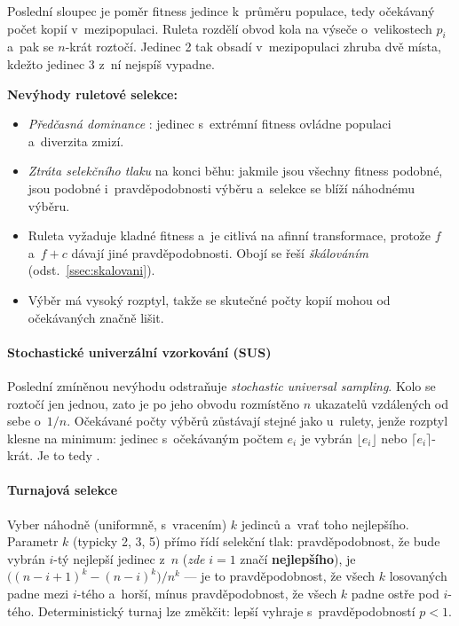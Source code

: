 \documentclass[11pt,a4paper]{article}
\theoremstyle{definition}
\begin{document}
Poslední sloupec je poměr fitness jedince k~průměru populace, tedy očekávaný počet kopií
v~mezipopulaci. Ruleta rozdělí obvod kola na výseče o~velikostech $p_i$ a~pak se $n$-krát
roztočí. Jedinec 2 tak obsadí v~mezipopulaci zhruba dvě místa, kdežto jedinec 3 z~ní nejspíš
vypadne.

\textbf{Nevýhody ruletové selekce:}
\begin{itemize}
\item \emph{Předčasná dominance} : jedinec s~extrémní fitness
  ovládne populaci a~diverzita zmizí.
\item \emph{Ztráta selekčního tlaku} na konci běhu: jakmile jsou všechny fitness
  podobné, jsou podobné i~pravděpodobnosti výběru a~selekce se blíží náhodnému výběru.
\item Ruleta vyžaduje kladné fitness a~je citlivá na afinní transformace, protože
  $f$ a~$f + c$ dávají jiné pravděpodobnosti. Obojí se řeší \emph{škálováním}
  (odst.~\ref{ssec:skalovani}).
\item Výběr má vysoký rozptyl, takže se skutečné počty kopií mohou od očekávaných
  značně lišit.
\end{itemize}

\paragraph{Stochastické univerzální vzorkování (SUS)}

Poslední zmíněnou nevýhodu odstraňuje \emph{stochastic universal sampling}. Kolo se roztočí
jen jednou, zato je po jeho obvodu rozmístěno $n$ ukazatelů vzdálených od sebe o~$1/n$.
Očekávané počty výběrů zůstávají stejné jako u~rulety, jenže rozptyl klesne na minimum:
jedinec s~očekávaným počtem $e_i$ je vybrán $\lfloor e_i \rfloor$ nebo
$\lceil e_i \rceil$-krát. Je to tedy .

\paragraph{Turnajová selekce}

\begin{defbox}
Vyber náhodně (uniformně, s~vracením) $k$ jedinců a~vrať toho nejlepšího.
Parametr $k$ (typicky 2, 3, 5) přímo řídí selekční tlak: pravděpodobnost, že
bude vybrán $i$-tý nejlepší jedinec z~$n$ (\emph{zde} $i=1$ značí
\textbf{nejlepšího}), je
$\big((n-i+1)^k - (n-i)^k\big)/n^k$ --- je to pravděpodobnost, že všech $k$
losovaných padne mezi $i$-tého a~horší, mínus pravděpodobnost, že všech $k$
padne ostře pod $i$-tého. Deterministický turnaj lze změkčit:
lepší vyhraje s~pravděpodobností $p < 1$.
\end{defbox}
\end{document}
